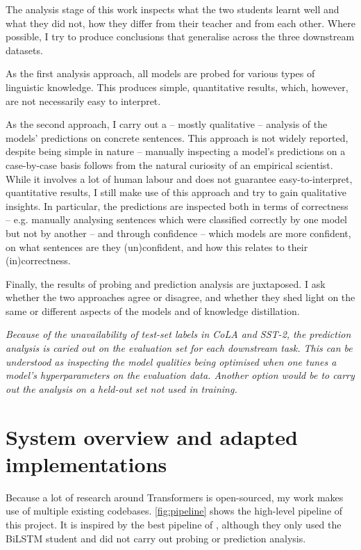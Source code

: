 \documentclass[bsc,frontabs,twoside,singlespacing,parskip,deptreport]{infthesis}
\begin{document}
{{    %
    The analysis stage of this work inspects what the two students learnt well and what they did not, how they differ from their teacher and from each other. 
    Where possible, I try to produce conclusions that generalise across the three downstream datasets.

    As the first analysis approach, all models are probed for various types of linguistic knowledge. This produces simple, quantitative results, which, however, are not necessarily easy to interpret.

    As the second approach, I carry out a -- mostly qualitative -- analysis of the models' predictions on concrete sentences. 
    This approach is not widely reported, despite being simple in nature -- manually inspecting a model's predictions on a case-by-case basis follows from the natural curiosity of an empirical scientist.
    While it involves a lot of human labour and does not guarantee easy-to-interpret, quantitative results, I still make use of this approach and try to gain qualitative insights.
    In particular, the predictions are inspected both in terms of correctness -- e.g. manually analysing sentences which were classified correctly by one model but not by another -- and through confidence -- which models are more confident, on what sentences are they (un)confident, and how this relates to their (in)correctness.

    Finally, the results of probing and prediction analysis are juxtaposed. I ask whether the two approaches agree or disagree, and whether they shed light on the same or different aspects of the models and of knowledge distillation.

    \textit{Because of the unavailability of test-set labels in CoLA and SST-2, the prediction analysis is caried out on the evaluation set for each downstream task. This can be understood as inspecting the model qualities being optimised when one tunes a model's hyperparameters on the evaluation data. Another option would be to carry out the analysis on a held-out set not used in training.}
  }

  \section{System overview and adapted implementations}{
    Because a lot of research around Transformers is open-sourced, my work makes use of multiple existing codebases. \autoref{fig:pipeline} shows the high-level pipeline of this project. It is inspired by the best pipeline of \citet{Tang_2019b}, although they only used the BiLSTM student and did not carry out probing or prediction analysis.
  
}}
\end{document}
